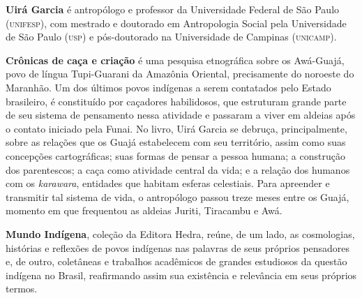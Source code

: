 \textbf{Uirá Garcia} é antropólogo e professor da Universidade Federal de São Paulo \textsc{(unifesp)}, com mestrado e doutorado em Antropologia Social pela Universidade de São Paulo \textsc{(usp)} e pós-doutorado na Universidade de Campinas \textsc{(unicamp)}. 
	
\textbf{Crônicas de caça e criação} é uma pesquisa etnográfica sobre os Awá-Guajá, povo de língua Tupi-Guarani da Amazônia Oriental, precisamente do noroeste do Maranhão. Um dos últimos povos indígenas a serem contatados pelo Estado brasileiro, é constituído por caçadores habilidosos, que estruturam grande parte de seu sistema de pensamento nessa atividade e passaram a viver em aldeias após o contato iniciado pela Funai. No livro, Uirá Garcia se debruça, principalmente, sobre as relações que os Guajá estabelecem com seu território, assim como suas concepções cartográficas; suas formas de pensar a pessoa humana; a construção dos parentescos; a caça como atividade central da vida; e a relação dos humanos com os \emph{karawara}, entidades que habitam esferas celestiais. Para apreender e transmitir tal sistema de vida, o antropólogo passou treze meses entre os Guajá, momento em que frequentou as aldeias Juriti, Tiracambu e Awá.

\textbf{Mundo Indígena}, coleção da Editora Hedra, reúne, de um lado, as cosmologias, histórias
e reflexões de povos indígenas nas palavras de seus próprios pensadores e, de outro, coletâneas
e trabalhos acadêmicos de grandes estudiosos da questão indígena no Brasil, reafirmando assim sua
existência e relevância em seus próprios termos.\par


